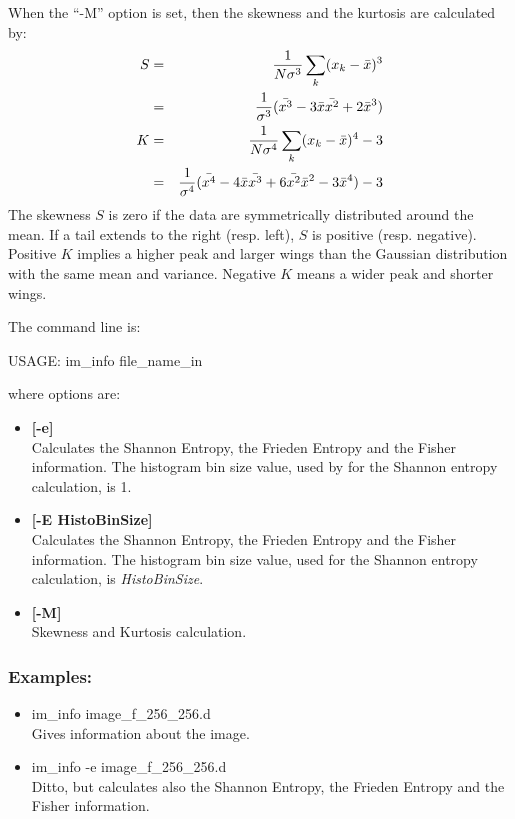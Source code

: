 When the ``-M'' option is set, then the skewness and the kurtosis
are calculated by:
\begin{eqnarray}
S  & = &  \frac{1}{N \sigma^3}\sum_k (x_k - {\bar x})^3  \nonumber \\
   & = &  \frac{1}{\sigma^3} ({\Bar {x^3}} - 3 {\bar x}{\Bar {x^2}} + 2{\bar x}^3) \\
K  & = &  \frac{1}{N \sigma^4}\sum_k (x_k - {\bar x})^4 - 3 \nonumber  \\
   & = &  \frac{1}{\sigma^4} ({\Bar {x^4}} - 4 {\bar x}{\Bar {x^3}} + 6 {\Bar {x^2}}{\bar x}^2 - 3 {\bar x}^4) - 3  
\end{eqnarray}
The skewness $S$ is zero if the data are symmetrically distributed around the mean.
If a tail extends to the right (resp. left), $S$ is positive (resp. negative).
Positive $K$ implies a higher peak and larger wings than the Gaussian 
distribution with the same mean and variance. Negative $K$ means a wider peak
and shorter wings.

The command line is:
{\bf
\begin{center}
     USAGE: im\_info file\_name\_in 
\end{center}
}
where options are:
\begin{itemize}
\item {\bf[-e]} \\
Calculates the Shannon Entropy, the Frieden Entropy and the Fisher information.
The histogram bin size value, used by for the
Shannon entropy calculation, is 1.
\item {\bf[-E HistoBinSize]} \\
Calculates the Shannon Entropy, the Frieden Entropy and the Fisher information.
The histogram bin size value, used for the
Shannon entropy calculation, is {\em HistoBinSize}.
\item {\bf[-M]} \\
Skewness and Kurtosis calculation.
\end{itemize}
\subsubsection*{Examples:}
\begin{itemize}
\item im\_info image\_f\_256\_256.d  \\
Gives information about the image.
\item im\_info -e image\_f\_256\_256.d \\
Ditto, but calculates also the Shannon Entropy, the Frieden Entropy and 
the Fisher information.
\end{itemize}

